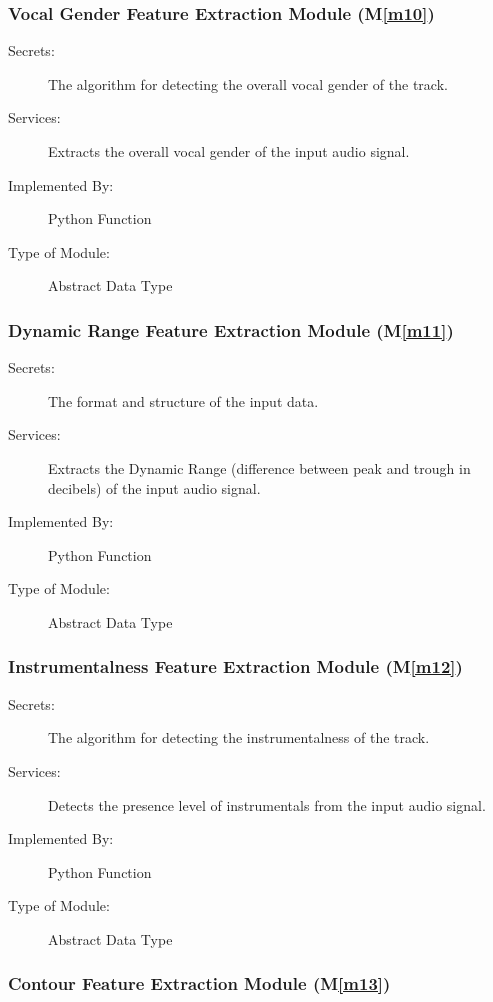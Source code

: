 \documentclass[12pt, titlepage]{article}
\newcommand{\mref}[1]{M\ref{#1}}
\begin{document}
\subsubsection{Vocal Gender Feature Extraction Module (\mref{m10})}

\begin{description}
\item[Secrets:] The algorithm for detecting the overall vocal gender of the track. 
\item[Services:]Extracts the overall vocal gender of the input audio signal. 
\item[Implemented By:] Python Function
\item[Type of Module:] Abstract Data Type
\end{description}

\subsubsection{Dynamic Range Feature Extraction Module (\mref{m11})}

\begin{description}
\item[Secrets:]The format and structure of the input data.
\item[Services:]Extracts the Dynamic Range (difference between peak and trough in decibels) of the input audio signal.
\item[Implemented By:] Python Function
\item[Type of Module:] Abstract Data Type
\end{description}

\subsubsection{Instrumentalness Feature Extraction Module (\mref{m12})}

\begin{description}
\item[Secrets:] The algorithm for detecting the instrumentalness of the track. 
\item[Services:] Detects the presence level of instrumentals from the input audio signal. 
\item[Implemented By:] Python Function
\item[Type of Module:] Abstract Data Type
\end{description}

\subsubsection{Contour Feature Extraction Module (\mref{m13})}
\end{document}
